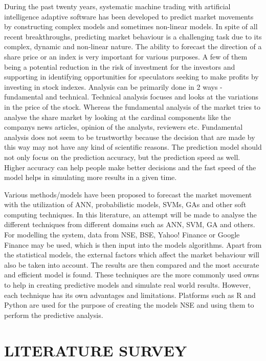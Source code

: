 \documentclass[BTech]{srmuthesis}
\begin{document}
During the past twenty years, systematic machine trading with artificial intelligence adaptive software has been developed to predict market movements by constructing complex models and sometimes non-linear models. In spite of all recent breakthroughs, predicting market behaviour is a challenging task due to its complex, dynamic and non-linear nature. The ability to forecast the direction of a share price or an index is very important for various purposes. A few of them being a potential reduction in the risk of investment for the investors and supporting in identifying opportunities for speculators seeking to make profits by investing in stock indexes. Analysis can be primarily done in 2 ways - fundamental and technical. Technical analysis focuses and looks at the variations in the price of the stock. Whereas the fundamental analysis of the market tries to analyse the share market by looking at the cardinal components like the company\textquotesingle s news articles, opinion of the analysts, reviewers etc. Fundamental analysis does not seem to be trustworthy because the decision that are made by this way may not have any kind of scientific reasons. The prediction model should not only focus on the prediction accuracy, but the prediction speed as well. Higher accuracy can help people make better decisions and the fast speed of the model helps in simulating more results in a given time. 

Various methods/models have been proposed to forecast the market movement with the utilization of ANN, probabilistic models, SVMs, GAs and other soft computing techniques. In this literature, an attempt will be made to analyse the different techniques from different domains such as ANN, SVM, GA and others. For modelling the system, data from NSE, BSE, Yahoo! Finance or Google Finance may be used, which is then input into the model\textquotesingle s algorithms. Apart from the statistical models, the external factors which affect the market behaviour will also be taken into account. The results are then compared and the most accurate and efficient model is found. These techniques are the more commonly used owns to help in creating predictive models and simulate real world results. However, each technique has its own advantages and limitations. Platforms such as R and Python are used for the purpose of creating the models \ac{NSE} and using them to perform the predictive analysis.
\\ \vspace{-5mm}

\chapter{LITERATURE SURVEY}
\end{document}
